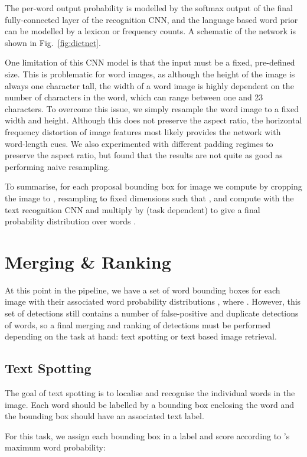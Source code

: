 \documentclass[twocolumn]{svjour3}          \smartqed  \usepackage{epsfig}
\begin{document}
The per-word output probability  is modelled by the softmax output of the final fully-connected layer of the recognition CNN, and the language based word prior  can be modelled by a lexicon or frequency counts. A schematic of the network is shown in Fig.~\ref{fig:dictnet}.

One limitation of this CNN model is that the input  must be a fixed, pre-defined size. This is problematic for word images, as although the height of the image is always one character tall, the width of a word image is highly dependent on the number of characters in the word, which can range between one and 23 characters. To overcome this issue, we simply resample the word image to a fixed width and height. Although this does not preserve the aspect ratio, the horizontal frequency distortion of image features most likely provides the network with word-length cues. We also experimented with different padding regimes to preserve the aspect ratio, but found that the results are not quite as good as performing naive resampling. 

To summarise, for each proposal bounding box  for image  we compute  by cropping the image to , resampling to fixed dimensions  such that , and compute  with the text recognition CNN and multiply by  (task dependent) to give a final probability distribution over words .

\section{Merging \& Ranking}
\label{sec:merging}
At this point in the pipeline, we have a set of word bounding boxes for each image  with their associated word probability distributions , where . However, this set of detections still contains a number of false-positive and duplicate detections of words, so a final merging and ranking of detections must be performed depending on the task at hand: text spotting or text based image retrieval.

\subsection{Text Spotting}
The goal of text spotting is to localise and recognise the individual words in the image. Each word should be labelled by a bounding box enclosing the word and the bounding box should have an associated text label.

For this task, we assign each bounding box in  a label  and score  according to 's maximum word probability:
\end{document}
